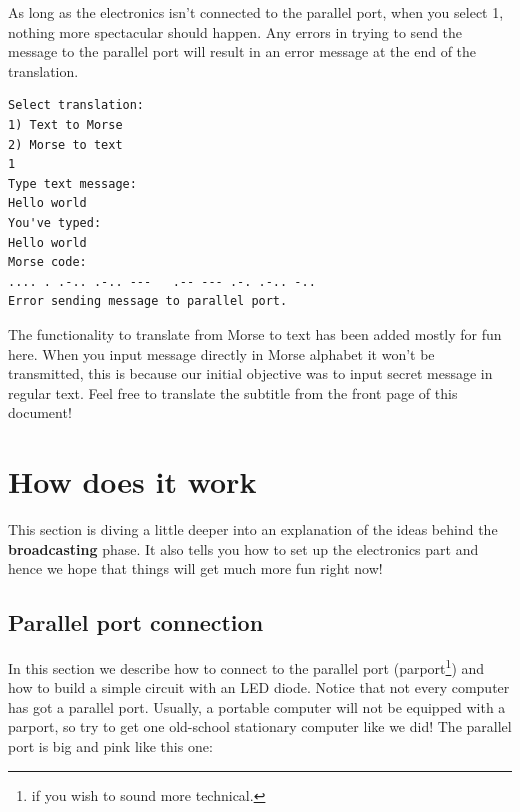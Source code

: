 \documentclass[10pt]{report}
\begin{document}
As long as the electronics isn't connected to the parallel port, when you select 1, nothing more spectacular should happen. Any errors in trying to send the message to the parallel port will result in an error message at the end of the translation.

\begin{snugshade}
\begin{verbatim}
Select translation:
1) Text to Morse
2) Morse to text
1
Type text message:
Hello world
You've typed: 
Hello world
Morse code: 
.... . .-.. .-.. ---   .-- --- .-. .-.. -.. 
Error sending message to parallel port.
\end{verbatim}
\end{snugshade}

The functionality to translate from Morse to text has been added mostly for fun here. When you input message directly in Morse alphabet it won't be transmitted, this is because our initial objective was to input secret message in regular text. Feel free to translate the subtitle from the front page of this document!

\section{How does it work} \label{sec:howB}

This section is diving a little deeper into an explanation of the ideas behind the \textbf{broadcasting} phase. It also tells you how to set up the electronics part and hence we hope that things will get much more fun right now!

\subsection{Parallel port connection} \label{sec:parportcon}

In this section we describe how to connect to the parallel port (parport\footnote{if you wish to sound more technical.}) and how to build a simple circuit with an LED diode. Notice that not every computer has got a parallel port. Usually, a portable computer will not be equipped with a parport, so try to get one old-school stationary computer like we did! The parallel port is big and pink like this one:
\end{document}
